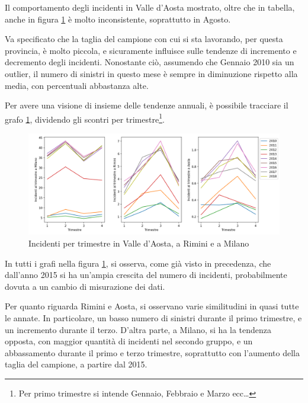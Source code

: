 \documentclass[a4paper,12pt]{report}
\begin{document}
Il comportamento degli incidenti in Valle d'Aosta mostrato, oltre che in tabella, 
anche in figura \ref{fig:aosta-rimini-milano-trimestre} è molto inconsistente, 
soprattutto in Agosto.

Va specificato che la taglia del campione con cui si sta lavorando, per questa provincia, 
è molto piccola, e sicuramente influisce sulle tendenze di incremento e decremento 
degli incidenti.
Nonostante ciò, assumendo che Gennaio 2010 sia un outlier, il numero di sinistri in 
questo mese è sempre in diminuzione rispetto alla media, con percentuali abbastanza alte.

Per avere una visione di insieme delle tendenze annuali, è possibile tracciare 
il grafo \ref{fig:aosta-rimini-milano-trimestre}, dividendo gli scontri 
per trimestre\footnote{Per primo trimestre si intende Gennaio, Febbraio e Marzo ecc\dots}.

\begin{figure}
    \includegraphics[width=\linewidth]{../src/incidenti/incidenti_senza_coords/mese_incidenti/trimestri_aosta_milano_rimini.png}
    \caption{Incidenti per trimestre in Valle d'Aosta, a Rimini e a Milano}
    \label{fig:aosta-rimini-milano-trimestre}
\end{figure}

In tutti i grafi nella figura \ref{fig:aosta-rimini-milano-trimestre}, 
si osserva, come già visto in precedenza, che dall'anno 2015 si ha un'ampia crescita  
del numero di incidenti, probabilmente dovuta a un cambio di misurazione dei dati. 

Per quanto riguarda Rimini e Aosta, si osservano varie similitudini in quasi 
tutte le annate. 
In particolare, un basso numero di sinistri 
durante il primo trimestre, e un incremento durante il terzo.
D'altra parte, a Milano, si ha la tendenza opposta, con maggior quantità di 
incidenti nel secondo gruppo, e un abbassamento durante il primo 
e terzo trimestre, soprattutto con l'aumento della taglia del campione, 
a partire dal 2015.
\end{document}
